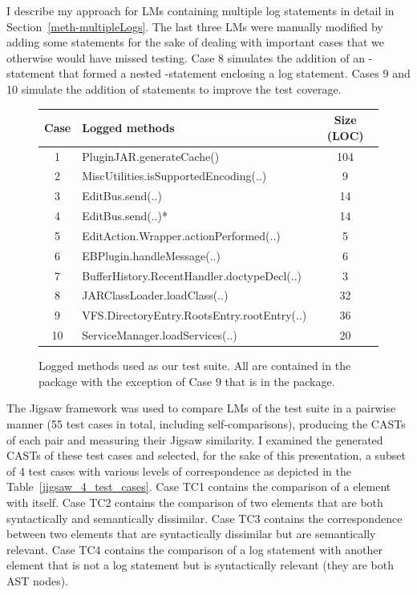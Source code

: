 I describe my approach for LMs containing multiple log statements in detail in Section~\ref{meth-multipleLogs}. The last three LMs were manually modified by adding some statements for the sake of dealing with important cases that we otherwise would have missed testing. Case 8 simulates the addition of an -statement that formed a nested -statement enclosing a log statement. Cases 9 and 10 simulate the addition of statements to improve the test coverage.


\begin{figure}[t]
  \centering
  \begin{tabular}{clc}
    \toprule
    Case & Logged methods & Size (LOC)\\
    \midrule
    1& {PluginJAR.generateCache()} &104\\
    2& {MiscUtilities.isSupportedEncoding(..)} &9\\
    3& {EditBus.send(..)} &14\\
    4& {EditBus.send(..)}* &14\\
    5& {EditAction.Wrapper.actionPerformed(..)} &5\\
    6& {EBPlugin.handleMessage(..)} &6\\
    7& {BufferHistory.RecentHandler.doctypeDecl(..)} &3\\
    8& {JARClassLoader.loadClass(..)} &32\\
    9& {VFS.DirectoryEntry.RootsEntry.rootEntry(..)} &36\\
    10& {ServiceManager.loadServices(..)} &20\\
    \bottomrule
  \end{tabular}
  \caption[Logged methods used as our test suite.]{Logged methods used as our test suite. All are contained in the \protect{} package with the exception of Case 9 that is in the \protect{} package.}
  \label{table:ljms}
\end{figure}



The Jigsaw framework was used to compare LMs of the test suite in a pairwise manner (55 test cases in total, including self-comparisons), producing the CASTs of each pair and measuring their Jigsaw similarity.
I examined the generated CASTs of these test cases and selected, for the sake of this presentation, a subset of 4 test cases with various levels of correspondence as depicted in the Table~\ref{jigsaw_4_test_cases}. Case TC1 contains the comparison of a  element with itself. Case TC2 contains the comparison of two  elements that are both syntactically and semantically dissimilar.  Case TC3 contains the correspondence between two  elements that are syntactically dissimilar but are semantically relevant. Case TC4 contains the comparison of a log statement with another  element that is not a log statement but is syntactically relevant (they are both   AST nodes).




